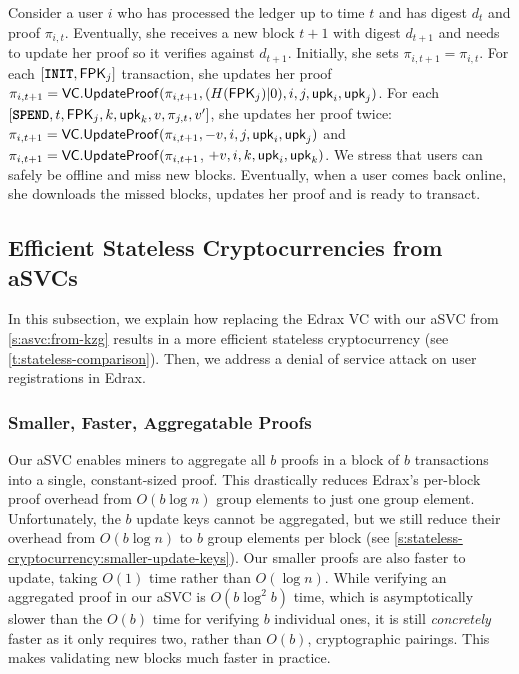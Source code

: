 Consider a user $i$ who has processed the ledger up to time $t$ and has digest $d_t$ and proof $\pi_{i,t}$.
Eventually, she receives a new block $t+1$ with digest $d_{t+1}$ and needs to update her proof so it verifies against $d_{t+1}$.
Initially, she sets $\pi_{i,t+1} = \pi_{i,t}$.
For each $[\texttt{\textbf{INIT}},\mathbf{\mathsf{FPK}}_j]$ transaction, she updates her proof $\pi_{i,t+1} = \mathsf{VC}.\mathsf{UpdateProof}(\pi_{i,t+1}, (H(\mathbf{\mathsf{FPK}}_j)|0), i,j, \mathsf{upk}_i, \mathsf{upk}_j)$.
For each $[\texttt{\textbf{SPEND}}, t, \mathbf{\mathsf{FPK}}_j, k, \mathsf{upk}_k, v,\pi_{j,t}, v']$, she updates her proof twice: $\pi_{i,t+1} =\mathsf{VC}.\mathsf{UpdateProof}(\pi_{i,t+1}, -v, i,j, \mathsf{upk}_i,\mathsf{upk}_j)$ and $\pi_{i,t+1} =\mathsf{VC}.\mathsf{UpdateProof}(\pi_{i,t+1}$, $+v, i, k, \mathsf{upk}_i,\mathsf{upk}_k)$.
We stress that users can safely be offline and miss new blocks.
Eventually, when a user comes back online, she downloads the missed blocks, updates her proof and is ready to transact.

\subsection{Efficient Stateless Cryptocurrencies from aSVCs}
In this subsection, we explain how replacing the Edrax VC with our aSVC from \cref{s:asvc:from-kzg} results in a more efficient stateless cryptocurrency (see \cref{t:stateless-comparison}).
Then, we address a denial of service attack on user registrations in Edrax.

\subsubsection{Smaller, Faster, Aggregatable Proofs}
Our aSVC enables miners to aggregate all $b$ proofs in a block of $b$ transactions into a single, constant-sized proof.
This drastically reduces Edrax's per-block proof overhead from $O(b\log{n})$ group elements to just one group element.
Unfortunately, the $b$ update keys cannot be aggregated, but we still reduce their overhead from $O(b\log{n})$ to $b$ group elements per block (see \cref{s:stateless-cryptocurrency:smaller-update-keys}).
Our smaller proofs are also faster to update, taking $O(1)$ time rather than $O(\log{n})$.
While verifying an aggregated proof in our aSVC is $O(b\log^2{b})$ time, which is asymptotically slower than the $O(b)$ time for verifying $b$ individual ones, it is still \textit{concretely} faster as it only requires two, rather than $O(b)$, cryptographic pairings.
This makes validating new blocks much faster in practice.

